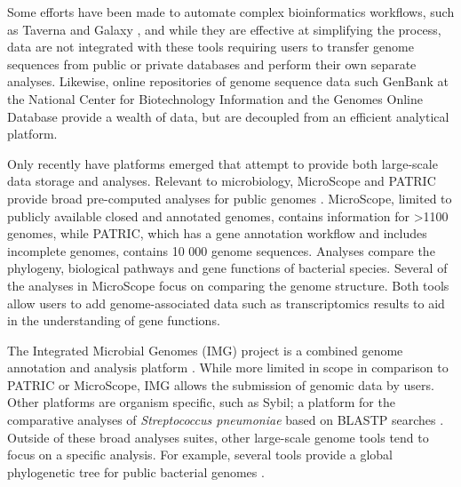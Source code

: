 \documentclass{bmcart}
\begin{document}
Some efforts have been made to automate complex bioinformatics workflows, such as Taverna \cite{lanzen_taverna_2008} and Galaxy \cite{goecks_galaxy:_2010}, and while they are effective at simplifying the process, data are not integrated with these tools requiring users to transfer genome sequences from public or private databases and perform their own separate analyses. Likewise, online repositories of genome sequence data such GenBank at the National Center for Biotechnology Information \cite{benson_genbank_2012} and the Genomes Online Database \cite{pagani_genomes_2012} provide a wealth of data, but are decoupled from an efficient analytical platform.

Only recently have platforms emerged that attempt to provide both large-scale data storage and analyses. Relevant to microbiology, MicroScope and PATRIC provide broad pre-computed analyses for public genomes  \cite{vallenet_microscope--integrated_2012,wattam_patric_2013}. MicroScope, limited to publicly available closed and annotated genomes, contains information for >1100 genomes, while PATRIC, which has a gene annotation workflow and includes incomplete genomes, contains 10 000 genome sequences. Analyses compare the phylogeny, biological pathways and gene functions of bacterial species. Several of the analyses in MicroScope focus on comparing the genome structure. Both tools allow users to add genome-associated data such as transcriptomics results to aid in the understanding of gene functions.

The Integrated Microbial Genomes (IMG) project is a combined genome annotation and analysis platform \cite{markowitz_img_2013}. While more limited in scope in comparison to PATRIC or MicroScope, IMG allows the submission of genomic data by users. Other platforms are organism specific, such as Sybil; a platform for the comparative analyses of \textit{Streptococcus pneumoniae} based on BLASTP searches \cite{riley_using_2012}. Outside of these broad analyses suites, other large-scale genome tools tend to focus on a specific analysis. For example, several tools provide a global phylogenetic tree for public bacterial genomes \cite{letunic_interactive_2011,fang_daily-updated_2013,federhen_ncbi_2011}. 
\end{document}
